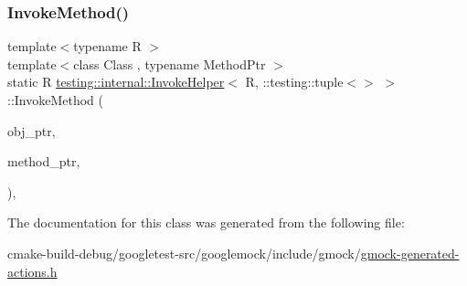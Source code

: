 \mbox{\label{classtesting_1_1internal_1_1InvokeHelper_3_01R_00_01_1_1testing_1_1tuple_3_4_01_4_a0368e26cbc1bcb12abbfb802f8294fa0}} 
\subsubsection{\texorpdfstring{InvokeMethod()}{InvokeMethod()}}
{\footnotesize\ttfamily template$<$typename R $>$ \\
template$<$class Class , typename Method\+Ptr $>$ \\
static R \mbox{\hyperlink{classtesting_1_1internal_1_1InvokeHelper}{testing\+::internal\+::\+Invoke\+Helper}}$<$ R, \+::testing\+::tuple$<$$>$ $>$\+::Invoke\+Method (\begin{DoxyParamCaption}\item[{Class $\ast$}]{obj\+\_\+ptr,  }\item[{Method\+Ptr}]{method\+\_\+ptr,  }\item[{const \+::testing\+::tuple$<$$>$ \&}]{ }\end{DoxyParamCaption})\hspace{0.3cm}{\ttfamily [inline]}, {\ttfamily [static]}}



The documentation for this class was generated from the following file\+:\begin{DoxyCompactItemize}
\item 
cmake-\/build-\/debug/googletest-\/src/googlemock/include/gmock/\mbox{\hyperlink{gmock-generated-actions_8h}{gmock-\/generated-\/actions.\+h}}\end{DoxyCompactItemize}
